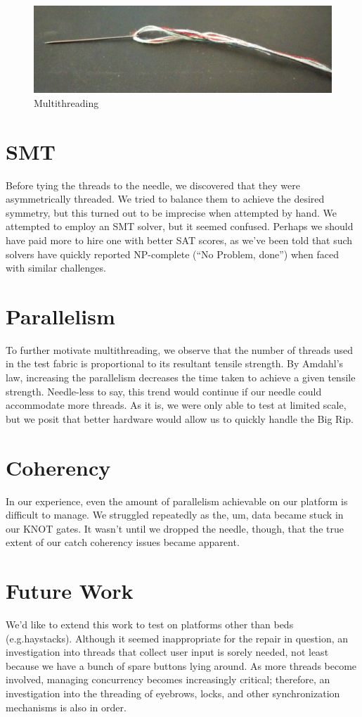\documentclass[letterpaper,twocolumn,12pt]{article}
\begin{document}
\begin{figure}[h]
\includegraphics[width=\columnwidth]{thread}
\caption{Multithreading}
\label{fig:thread}
\end{figure}

\section{SMT}
Before tying the threads to the needle, we discovered that they were asymmetrically threaded.
We tried to balance them to achieve the desired symmetry, but this turned out to be imprecise when attempted by hand.
We attempted to employ an SMT solver, but it seemed confused.
Perhaps we should have paid more to hire one with better SAT scores, as we've been told that such solvers have quickly reported NP-complete (``No Problem, done'') when faced with similar challenges.

\section{Parallelism}
\label{sec:parallelism}
To further motivate multithreading, we observe that the number of threads used in the test fabric is proportional to its resultant tensile strength.
By Amdahl's law, increasing the parallelism decreases the time taken to achieve a given tensile strength.
Needle-less to say, this trend would continue if our needle could accommodate more threads.
As it is, we were only able to test at limited scale, but we posit that better hardware would allow us to quickly handle the Big Rip.

\section{Coherency}
In our experience, even the amount of parallelism achievable on our platform is difficult to manage.
We struggled repeatedly as the, um, data became stuck in our KNOT gates.
It wasn't until we dropped the needle, though, that the true extent of our catch coherency issues became apparent.

\section{Future Work}
We'd like to extend this work to test on platforms other than beds (e.g.\@ haystacks).
Although it seemed inappropriate for the repair in question, an investigation into threads that collect user input is sorely needed, not least because we have a bunch of spare buttons lying around.
As more threads become involved, managing concurrency becomes increasingly critical; therefore, an investigation into the threading of eyebrows, locks, and other synchronization mechanisms is also in order.
\end{document}
